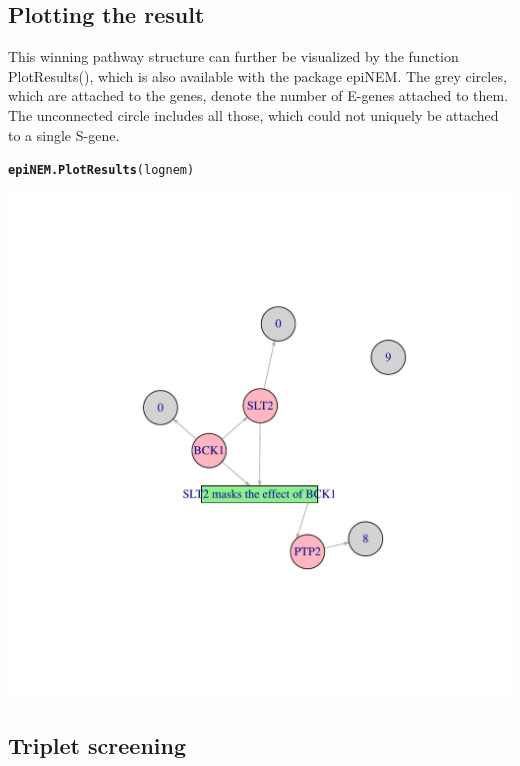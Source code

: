 \documentclass[paper=a4,notitlepage,DIV=12]{scrartcl}\usepackage[]{graphicx}\usepackage[]{color}
\makeatletter
\def\maxwidth{ %
  \ifdim\Gin@nat@width>\linewidth
    \linewidth
  \else
    \Gin@nat@width
  \fi
}
\newcommand{\hlstd}[1]{\textcolor[rgb]{0.345,0.345,0.345}{#1}}%
\newcommand{\hlkwd}[1]{\textcolor[rgb]{0.737,0.353,0.396}{\textbf{#1}}}%
\newenvironment{kframe}{%
 \def\at@end@of@kframe{}%
 \ifinner\ifhmode%
  \def\at@end@of@kframe{\end{minipage}}%
  \begin{minipage}{\columnwidth}%
 \fi\fi%
 \def\FrameCommand##1{\hskip\@totalleftmargin \hskip-\fboxsep
 \colorbox{shadecolor}{##1}\hskip-\fboxsep
     \hskip-\linewidth \hskip-\@totalleftmargin \hskip\columnwidth}%
 \MakeFramed {\advance\hsize-\width
   \@totalleftmargin\z@ \linewidth\hsize
   \@setminipage}}%
 {\par\unskip\endMakeFramed%
 \at@end@of@kframe}
\newenvironment{knitrout}{}{} %
\makeatother
\begin{document}
\subsection{Plotting the result}

This winning pathway structure can further be visualized by the function PlotResults(), which is also available with the package epiNEM. The grey circles, which are attached to the genes, denote the number of E-genes attached to them. The unconnected circle includes all those, which could not uniquely be attached to a single S-gene.

\begin{knitrout}
\color{fgcolor}\begin{kframe}
\begin{alltt}
\hlkwd{epiNEM.PlotResults}\hlstd{(lognem)}
\end{alltt}
\end{kframe}
\includegraphics[width=\maxwidth]{figure/unnamed-chunk-11-1} 

\end{knitrout}

\subsection{Triplet screening}
\end{document}
